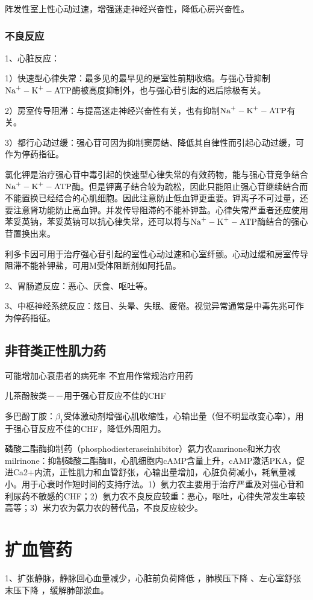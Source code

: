 \documentclass[UTF8]{ctexbook}
\begin{document}
阵发性室上性心动过速，增强迷走神经兴奋性，降低心房兴奋性。

\subsubsection{不良反应}
1、心脏反应：

1）快速型心律失常：最多见的最早见的是室性前期收缩。与强心苷抑制\(\textup{Na}^{+}-\textup{K}^{+}-\textup{ATP}\)酶被高度抑制外，也与强心苷引起的迟后除极有关。

2）房室传导阻滞：与提高迷走神经兴奋性有关，也有抑制\(\textup{Na}^{+}-\textup{K}^{+}-\textup{ATP}\)有关。

3）都行心动过缓：强心苷可因为抑制窦房结、降低其自律性而引起心动过缓，可作为停药指征。

氯化钾是治疗强心苷中毒引起的快速型心律失常的有效药物，能与强心苷竞争结合\(\textup{Na}^{+}-\textup{K}^{+}-\textup{ATP}\)酶。但是钾离子结合较为疏松，因此只能阻止强心苷继续结合而不能置换已经结合的心肌细胞。因此注意防止低血钾更重要。钾离子不可过量，还要注意肾功能防止高血钾。并发传导阻滞的不能补钾盐。心律失常严重者还应使用苯妥英钠，苯妥英钠可以抗心律失常，还可以将与\(\textup{Na}^{+}-\textup{K}^{+}-\textup{ATP}\)酶结合的强心苷置换出来。

利多卡因可用于治疗强心苷引起的室性心动过速和心室纤颤。心动过缓和房室传导阻滞不能补钾盐，可用M受体阻断剂如阿托品。

2、胃肠道反应：恶心、厌食、呕吐等。

3、中枢神经系统反应：炫目、头晕、失眠、疲倦。视觉异常通常是中毒先兆可作为停药指征。

\subsection{非苷类正性肌力药}
可能增加心衰患者的病死率 不宜用作常规治疗用药

儿茶酚胺类－－用于强心苷反应不佳的CHF

多巴酚丁胺：\(\beta_{1}\)受体激动剂增强心肌收缩性，心输出量（但不明显改变心率），用于强心苷反应不佳的CHF，降低外周阻力。

磷酸二酯酶抑制药（phosphodiesteraseinhibitor）氨力农amrinone和米力农milrinone：抑制磷酸二酯酶Ⅲ，心肌细胞内cAMP含量上升，cAMP激活PKA，促进Ca2+内流，正性肌力和血管舒张，心输出量增加，心脏负荷减小，耗氧量减小。用于心衰时作短时间的支持疗法。1）氨力农主要用于治疗严重及对强心苷和利尿药不敏感的CHF；2）氨力农不良反应较重：恶心，呕吐，心律失常发生率较高等；3）米力农为氨力农的替代品，不良反应较少。
\section{扩血管药}
1、扩张静脉，静脉回心血量减少，心脏前负荷降低 ，肺楔压下降 、左心室舒张末压下降 ，缓解肺部淤血。
\end{document}
